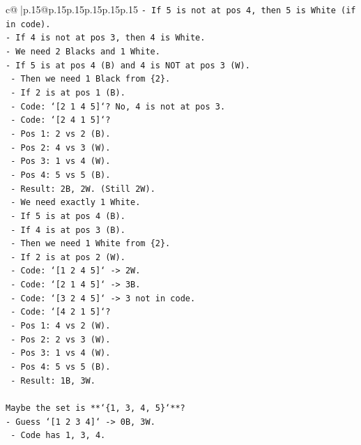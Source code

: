 \documentclass{article}
\begin{document}
{\begin{supertabular}{c@{$\;$}|p{.15\linewidth}@{}p{.15\linewidth}p{.15\linewidth}p{.15\linewidth}p{.15\linewidth}p{.15\linewidth}}
{{{\texttt{{-} If 5 is not at pos 4, then 5 is White (if in code).} \\
\texttt{{-} If 4 is not at pos 3, then 4 is White.} \\
\texttt{{-} We need 2 Blacks and 1 White.} \\
\texttt{{-} If 5 is at pos 4 (B) and 4 is NOT at pos 3 (W).} \\
\texttt{  {-} Then we need 1 Black from \{2\}.} \\
\texttt{  {-} If 2 is at pos 1 (B).} \\
\texttt{  {-} Code: `{[}2 1 4 5{]}`? No, 4 is not at pos 3.} \\
\texttt{  {-} Code: `{[}2 4 1 5{]}`?} \\
\texttt{    {-} Pos 1: 2 vs 2 (B).} \\
\texttt{    {-} Pos 2: 4 vs 3 (W).} \\
\texttt{    {-} Pos 3: 1 vs 4 (W).} \\
\texttt{    {-} Pos 4: 5 vs 5 (B).} \\
\texttt{    {-} Result: 2B, 2W. (Still 2W).} \\
\texttt{  {-} We need exactly 1 White.} \\
\texttt{  {-} If 5 is at pos 4 (B).} \\
\texttt{  {-} If 4 is at pos 3 (B).} \\
\texttt{  {-} Then we need 1 White from \{2\}.} \\
\texttt{  {-} If 2 is at pos 2 (W).} \\
\texttt{  {-} Code: `{[}1 2 4 5{]}` {-}> 2W.} \\
\texttt{  {-} Code: `{[}2 1 4 5{]}` {-}> 3B.} \\
\texttt{  {-} Code: `{[}3 2 4 5{]}` {-}> 3 not in code.} \\
\texttt{  {-} Code: `{[}4 2 1 5{]}`?} \\
\texttt{    {-} Pos 1: 4 vs 2 (W).} \\
\texttt{    {-} Pos 2: 2 vs 3 (W).} \\
\texttt{    {-} Pos 3: 1 vs 4 (W).} \\
\texttt{    {-} Pos 4: 5 vs 5 (B).} \\
\texttt{    {-} Result: 1B, 3W.} \\
\\ 
\texttt{Maybe the set is **`\{1, 3, 4, 5\}`**?} \\
\texttt{{-} Guess `{[}1 2 3 4{]}` {-}> 0B, 3W.} \\
\texttt{  {-} Code has 1, 3, 4.} \\
}}}
\end{supertabular}}
\end{document}

